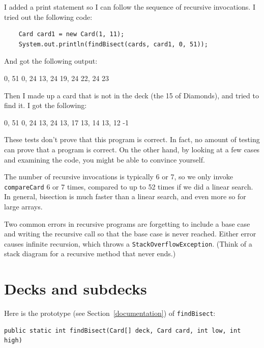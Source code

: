 \documentclass[12pt]{book}
\theoremstyle{exercise}
\begin{document}
I added a print statement so I can follow
the sequence of recursive invocations.  I tried out the
following code:

\begin{lstlisting}
    Card card1 = new Card(1, 11);
    System.out.println(findBisect(cards, card1, 0, 51));
\end{lstlisting}
%
And got the following output:

\begin{verbatimtab}
0, 51
0, 24
13, 24
19, 24
22, 24
23
\end{verbatimtab}
%
Then I made up a card that is not in the deck (the 15 of Diamonds),
and tried to find it.  I got the following:

\begin{verbatimtab}
0, 51
0, 24
13, 24
13, 17
13, 14
13, 12
-1
\end{verbatimtab}
%
These tests don't prove that this program is correct.  In fact, no
amount of testing can prove that a program is correct.  On the other
hand, by looking at a few cases and examining the code, you might be
able to convince yourself.

The number of recursive invocations is typically 6 or 7,
so we only invoke {\tt compareCard} 6 or 7 times,
compared to up to 52 times if we did a linear search.  In general,
bisection is much faster than a linear search, and even more so for
large arrays.

Two common errors in recursive programs are forgetting to include a
base case and writing the recursive call so that the base case is never
reached.  Either error causes infinite recursion,
which throws a {\tt StackOverflowException}.
(Think of a stack diagram for a recursive method that never ends.)


\section{Decks and subdecks}

Here is the prototype (see Section~\ref{documentation}) of {\tt findBisect}:

\begin{lstlisting}
public static int findBisect(Card[] deck, Card card, int low, int high)
\end{lstlisting}

\end{document}
